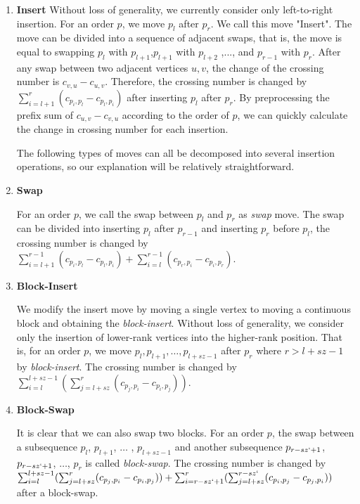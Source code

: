 \documentclass[a4paper,ctexart,UKenglish,cleveref, autoref, thm-restate]{lipics-v2021}
\begin{document}
\begin{enumerate}
    \item \textbf{Insert}
    Without loss of generality, we currently consider only left-to-right insertion. For an order $p$, we move $p_l$ after $p_r$. We call this move "Insert". 
    The move can be divided into a sequence of adjacent swaps, that is, the move is equal to swapping $p_l$ with $p_{l+1}$,$p_{l+1}$ with $p_{l+2}$ ,..., and $p_{r-1}$ with $p_{r}$. 
    After any swap between two adjacent vertices $u,v$, the change of the crossing number is $c_{v,u}-c_{u,v}$. Therefore, the crossing number is changed by $\sum_{i=l+1}^{r}(c_{p_i,p_l}-c_{p_l,p_i})$ after inserting $p_l$ after $p_r$.
    By preprocessing the prefix sum of $c_{u,v}-c_{v,u}$ according to the order of $p$, we can quickly calculate the change in crossing number for each insertion.

    The following types of moves can all be decomposed into several insertion operations, so our explanation will be relatively straightforward.
    \item \textbf{Swap}
    
    For an order $p$, we call the swap between $p_l$ and $p_r$ as \textit{swap} move. The swap can be divided into inserting $p_l$ after $p_{r-1}$ and inserting $p_r$ before $p_l$, the crossing number is changed by$\sum_{i=l+1}^{r-1}(c_{p_i,p_l}-c_{p_l,p_i})+\sum_{i=l}^{r-1}(c_{p_r,p_i}-c_{p_i,p_r})$.
    
    \item \textbf{Block-Insert}
    
    We modify the insert move by moving a single vertex to moving a continuous block and obtaining the \textit{block-insert}. Without loss of generality, we consider only the insertion of lower-rank vertices into the higher-rank position. 
    That is, for an order $p$, we move $p_l,p_{l+1},\ldots,p_{l+sz-1}$ after $p_r$ where $r>l+sz-1$ by \textit{block-insert}. The crossing number is changed by$\sum_{i=l}^{l+sz-1}(\sum_{j=l+sz}^{r}(c_{p_j,p_i}-c_{p_i,p_j}))$.

    \item \textbf{Block-Swap}
    
    It is clear that we can also swap two blocks. 
    For an order $p$, the swap between a subsequence $p_l$, $p_{l+1}$, $\ldots$ , $p_{l+sz-1}$ and another subsequence $p_{r-sz`+1}$, $p_{r-sz`+1}$, $\ldots$, $p_r$ is called \textit{block-swap}. 
    The crossing number is changed by $\sum_{i=l}^{l+sz-1}(\sum_{j=l+sz}^{r}(c_{p_j,p_i}-c_{p_i,p_j}))+\sum_{i=r-sz`+1}^{r}(\sum_{j=l+sz}^{r-sz`}(c_{p_i,p_j}-c_{p_j,p_i}))$ after a block-swap.
\end{enumerate}
\end{document}
